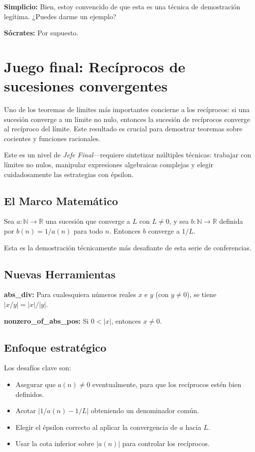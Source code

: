 \textbf{Simplicio:} Bien, estoy convencido de que esta es una técnica de
demostración legítima. ¿Puedes darme un ejemplo?

\textbf{Sócrates:} Por supuesto.

\section{Juego final: Recíprocos de sucesiones convergentes}

Uno de los teoremas de límites más importantes concierne a los recíprocos:
si una sucesión converge a un límite no nulo, entonces la sucesión de
recíprocos converge al recíproco del límite. Este resultado es crucial para
demostrar teoremas sobre cocientes y funciones racionales.

Este es un nivel de \emph{Jefe Final}—requiere sintetizar múltiples
técnicas: trabajar con límites no nulos, manipular expresiones algebraicas
complejas y elegir cuidadosamente las estrategias con épsilon.

\subsection{El Marco Matemático}

\begin{theorem}
Sea $a : \mathbb{N} \to \mathbb{R}$ una sucesión que converge a $L$ con
$L \neq 0$, y sea $b : \mathbb{N} \to \mathbb{R}$ definida por
$b(n) = 1/a(n)$ para todo $n$. Entonces $b$ converge a $1/L$.
\end{theorem}

Esta es la demostración técnicamente más desafiante de esta serie de
conferencias.

\subsection{Nuevas Herramientas}

\textbf{abs\_div:} Para cualesquiera números reales $x$ e $y$ (con
$y \neq 0$), se tiene $|x/y| = |x|/|y|$.

\textbf{nonzero\_of\_abs\_pos:} Si $0 < |x|$, entonces $x \neq 0$.

\subsection{Enfoque estratégico}

Los desafíos clave son:

\begin{itemize}
  \item Asegurar que $a(n) \neq 0$ eventualmente, para que los recíprocos
        estén bien definidos.
  \item Acotar $|1/a(n) - 1/L|$ obteniendo un denominador común.
  \item Elegir el épsilon correcto al aplicar la convergencia de $a$ hacia
        $L$.
  \item Usar la cota inferior sobre $|a(n)|$ para controlar los
        recíprocos.
\end{itemize}

